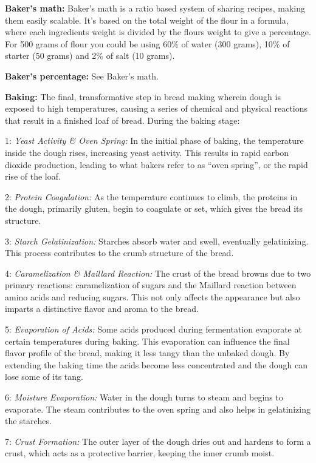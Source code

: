 \textbf{Baker’s math:} Baker’s math is a ratio based system of sharing recipes,
making them easily scalable. It’s based on the total weight of the flour in a formula,
where each ingredients weight is divided by the flours weight to give a percentage.
For 500 grams of flour you could be using 60\% of water (300 grams), 10\% of starter
(50 grams) and 2\% of salt (10 grams).

\textbf{Baker’s percentage:} See Baker’s math.

\textbf{Baking:} The final, transformative step in bread making wherein dough is
exposed to high temperatures, causing a series of chemical and physical reactions
that result in a finished loaf of bread. During the baking stage:

1: \textit{Yeast Activity \& Oven Spring:} In the initial phase of baking, the
temperature inside the dough rises, increasing yeast activity. This results in rapid
carbon dioxide production, leading to what bakers refer to as ``oven spring'', or the
rapid rise of the loaf.

2: \textit{Protein Coagulation:} As the temperature continues to climb, the proteins
in the dough, primarily gluten, begin to coagulate or set, which gives the bread its
structure.

3: \textit{Starch Gelatinization:} Starches absorb water and swell, eventually
gelatinizing. This process contributes to the crumb structure of the bread.

4: \textit{Caramelization \& Maillard Reaction:} The crust of the bread browns due
to two primary reactions: caramelization of sugars and the Maillard reaction between
amino acids and reducing sugars. This not only affects the appearance but also imparts
a distinctive flavor and aroma to the bread.

5: \textit{Evaporation of Acids:} Some acids produced during fermentation evaporate at
certain temperatures during baking. This evaporation can influence the final flavor
profile of the bread, making it less tangy than the unbaked dough. By extending the
baking time the acids become less concentrated and the dough can lose some of its tang.

6: \textit{Moisture Evaporation:} Water in the dough turns to steam and begins to
evaporate. The steam contributes to the oven spring and also helps in gelatinizing
the starches.

7: \textit{Crust Formation:} The outer layer of the dough dries out and hardens to
form a crust, which acts as a protective barrier, keeping the inner crumb moist.

